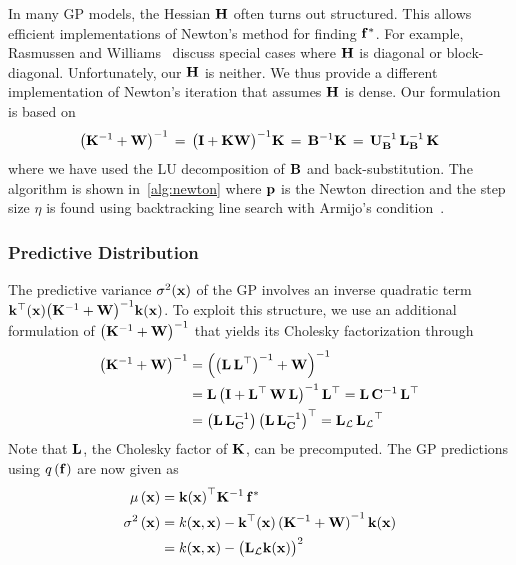 In many GP models, the Hessian \(\mathbf{H}\) often turns out structured.
This allows efficient implementations of Newton's method for finding \(\mathbf{f}^*\).
For example, Rasmussen and Williams~\cite{rasmussen_gaussian_2006} discuss special cases where \(\mathbf{H}\) is diagonal or block-diagonal.
Unfortunately, our \(\mathbf{H}\) is neither.
We thus provide a different implementation of Newton's iteration that assumes \(\mathbf{H}\) is dense.
Our formulation is based on 
{\small
\begin{align}
  {\big(\mathbf{K}^{-1} + \mathbf{W}\big)}^{-1}
  \,=\, {{\big(\mathbf{I} + \mathbf{K} \mathbf{W} \big)}^{-1} \mathbf{K}}
  \,=\, \mathbf{B}^{-1} \mathbf{K} 
  \,=\, \mathbf{U}_{\mathbf{B}}^{-1} \, \mathbf{L}_{\mathbf{B}}^{-1} \, \mathbf{K}
\end{align}
}%
{\noindent}where we have used the LU decomposition of \(\mathbf{B}\) and back-substitution.
The algorithm is shown in~\cref{alg:newton} where \(\mathbf{p}\) is the Newton direction and the step size \(\eta\) is found using backtracking line search with Armijo's condition~\cite{nocedal_numerical_2006}.

\subsubsection{Predictive Distribution}
The predictive variance \(\sigma^2(\mathbf{x})\) of the GP involves an inverse quadratic term \(\mathbf{k}^{\top}(\mathbf{x}) {\big(\mathbf{K}^{-1} + \mathbf{W}\big)}^{-1} \mathbf{k}(\mathbf{x})\).
To exploit this structure, we use an additional formulation of \({\big(\mathbf{K}^{-1} + \mathbf{W}\big)}^{-1}\) that yields its Cholesky factorization through 
{\small
\begin{align}
  {\big(\mathbf{K}^{-1} + \mathbf{W}\big)}^{-1}
  &= { \Big({\big(\mathbf{L}\,\mathbf{L}^{\top}\big)}^{-1} + \mathbf{W} \Big) }^{-1} \nonumber\\
  &= \mathbf{L}\,{\big(\mathbf{I} + \mathbf{L}^{\top}\,\mathbf{W}\,\mathbf{L} \big)}^{-1}\,\mathbf{L}^{\top} \nonumber
  = \mathbf{L}\, \mathbf{C}^{-1} \,\mathbf{L}^{\top} \\
  &= \big( \mathbf{L}\, \mathbf{L}_{\mathbf{C}}^{-1} \big)\, {\big( \mathbf{L}\, \mathbf{L}_{\mathbf{C}}^{-1} \big)}^{\top} 
  = \mathbf{L}_{\mathcal{L}} \, { \mathbf{L}_{\mathcal{L}} }^{\top}
\end{align}
}%
Note that \(\mathbf{L}\), the Cholesky factor of \(\mathbf{K}\), can be precomputed.
The GP predictions using \(q\,(\mathbf{f})\) are now given as
\begin{align}
  \mu\,(\mathbf{x})
  &= {\mathbf{k}(\mathbf{x})}^{\top} \mathbf{K}^{-1} \, \mathbf{f}^*  \\
  \sigma^2\,(\mathbf{x})
  &= k(\mathbf{x}, \mathbf{x}) - \mathbf{k}^{\top}(\mathbf{x}) \, {(\mathbf{K}^{-1} + \mathbf{W})}^{-1} \, \mathbf{k}(\mathbf{x}) \nonumber \\
  &= k(\mathbf{x}, \mathbf{x}) - {\big( \mathbf{L}_{\mathcal{L}} \mathbf{k}(\mathbf{x}) \big)}^2
\end{align}

